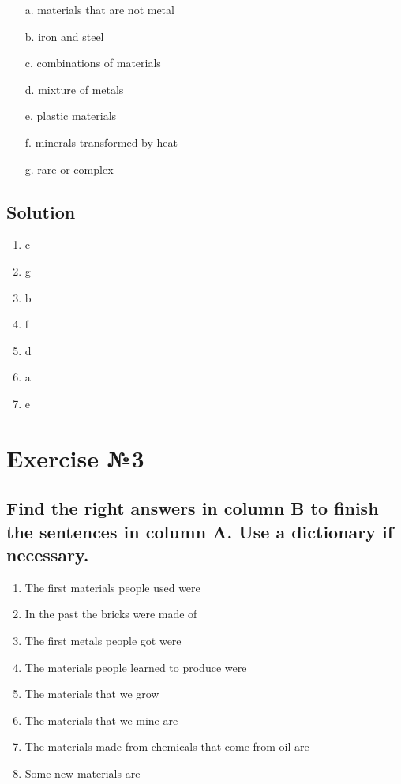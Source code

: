 \begin{enumerate}
      \item[a.] materials that are not metal
      \item[b.] iron and steel
      \item[c.] combinations of materials
      \item[d.] mixture of metals
      \item[e.] plastic materials
      \item[f.] minerals transformed by heat
      \item[g.] rare or complex
\end{enumerate}

\subsection*{Solution}
\begin{enumerate}
      \item c
      \item g
      \item b
      \item f
      \item d
      \item a
      \item e
\end{enumerate}

\section{Exercise №3}

\subsection*{Find the right answers in column B to finish the sentences in column A. Use a dictionary if
      necessary.}

\begin{enumerate}
      \item The first materials people used were
      \item In the past the bricks were made of
      \item The first metals people got were
      \item The materials people learned to produce were
      \item The materials that we grow
      \item The materials that we mine are
      \item The materials made from chemicals that come from oil are
      \item Some new materials are
\end{enumerate}

